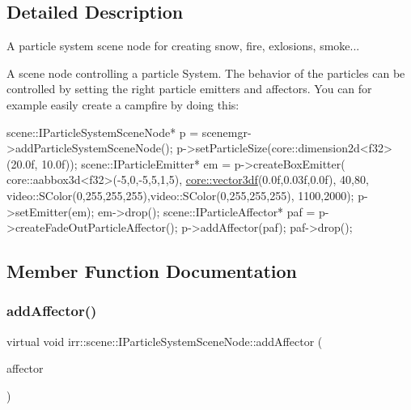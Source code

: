 \subsection{Detailed Description}
A particle system scene node for creating snow, fire, exlosions, smoke... 

A scene node controlling a particle System. The behavior of the particles can be controlled by setting the right particle emitters and affectors. You can for example easily create a campfire by doing this\+:


\begin{DoxyCode}
scene::IParticleSystemSceneNode* p = scenemgr->addParticleSystemSceneNode();
p->setParticleSize(core::dimension2d<f32>(20.0f, 10.0f));
scene::IParticleEmitter* em = p->createBoxEmitter(
    core::aabbox3d<f32>(-5,0,-5,5,1,5),
    \hyperlink{namespaceirr_1_1core_ae6e2b2a6c552833ebbd5b7463d03586b}{core::vector3df}(0.0f,0.03f,0.0f),
    40,80, video::SColor(0,255,255,255),video::SColor(0,255,255,255), 1100,2000);
p->setEmitter(em);
em->drop();
scene::IParticleAffector* paf = p->createFadeOutParticleAffector();
p->addAffector(paf);
paf->drop();
\end{DoxyCode}
 

\subsection{Member Function Documentation}
\mbox{\label{classirr_1_1scene_1_1IParticleSystemSceneNode_a401f5afbbb748878011c5ceb7d447f8b}} 
\subsubsection{\texorpdfstring{add\+Affector()}{addAffector()}\hspace{0.1cm}{\footnotesize\ttfamily [1/2]}}
{\footnotesize\ttfamily virtual void irr\+::scene\+::\+I\+Particle\+System\+Scene\+Node\+::add\+Affector (\begin{DoxyParamCaption}\item[{\hyperlink{classirr_1_1scene_1_1IParticleAffector}{I\+Particle\+Affector} $\ast$}]{affector }\end{DoxyParamCaption})\hspace{0.3cm}{\ttfamily [pure virtual]}}



